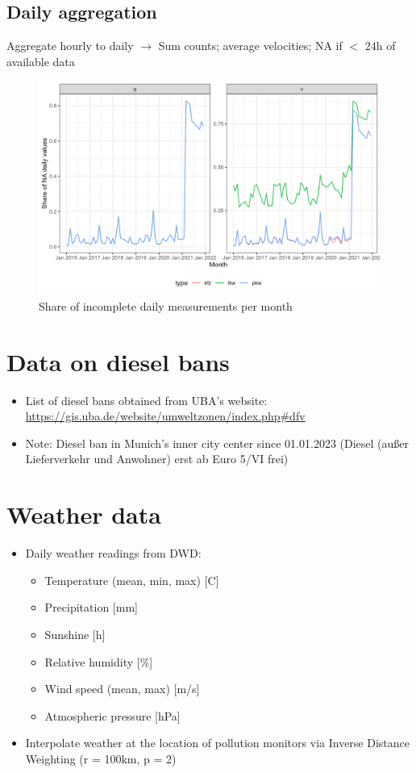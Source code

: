 \documentclass[a4paper, 10pt]{article}
\begin{document}
\clearpage\FloatBarrier
\subsection{Daily aggregation}

Aggregate hourly to daily $\rightarrow$ Sum counts; average velocities; NA if $<$ 24h of available data

\begin{figure}[!htb]
\centering
\caption{Share of incomplete daily measurements per month}
\includegraphics[width = .65\textwidth]{../04_figures/daily_incomplete_share.png}
\end{figure}


\clearpage\FloatBarrier
\section{Data on diesel bans}

\begin{itemize}
	\item List of diesel bans obtained from UBA's website: \url{https://gis.uba.de/website/umweltzonen/index.php#dfv}
	\item Note: Diesel ban in Munich's inner city center since 01.01.2023 (Diesel (außer Lieferverkehr und Anwohner) erst ab Euro 5/VI frei)
\end{itemize}




\section{Weather data}

\begin{itemize}
	\item Daily weather readings from DWD: 
	\begin{itemize}
		\item Temperature (mean, min, max) [\degree C] 
		\item Precipitation [mm]
		\item Sunshine [h]
		\item Relative humidity [\%] 
		\item Wind speed (mean, max) [m/s] 
		\item Atmospheric pressure [hPa]
	\end{itemize}
	\item Interpolate weather at the location of pollution monitors via Inverse Distance Weighting (r = 100km, p = 2)
\end{itemize}
\end{document}
